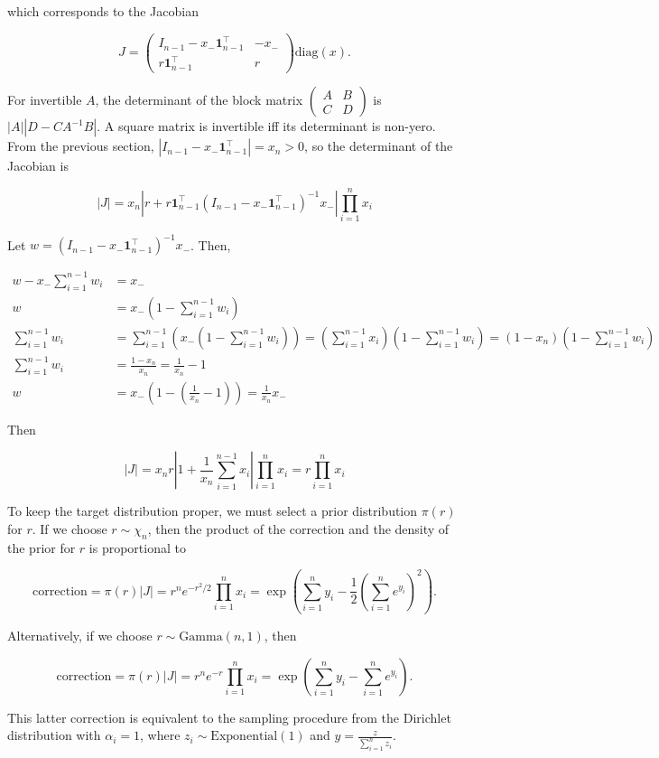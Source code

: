 \documentclass[twoside]{article}
\begin{document}
which corresponds to the Jacobian

$$J = \begin{pmatrix}I_{n-1} - x_- \boldsymbol{1}_{n-1}^\top & -x_- \\ r \boldsymbol{1}_{n-1}^\top & r \end{pmatrix} \mathrm{diag}(x).$$

For invertible $A$, the determinant of the block matrix $\begin{pmatrix}A & B \\ C & D\end{pmatrix}$ is $|A| |D-CA^{-1}B|$.
A square matrix is invertible iff its determinant is non-yero.
From the previous section, $|I_{n-1} - x_- \boldsymbol{1}_{n-1}^\top| = x_n > 0$, so the determinant of the Jacobian is

$$|J| = x_n \left|r + r \boldsymbol{1}_{n-1}^\top (I_{n-1} - x_- \boldsymbol{1}_{n-1}^\top)^{-1} x_-\right| \prod_{i=1}^n x_i$$

Let $w = (I_{n-1} - x_- \boldsymbol{1}_{n-1}^\top)^{-1} x_-$. Then,

$$
\begin{aligned}
    w - x_- \sum_{i=1}^{n-1} w_i &= x_-\\
    w &= x_- \left(1 - \sum_{i=1}^{n-1} w_i\right)\\
    \sum_{i=1}^{n-1} w_i &= \sum_{i=1}^{n-1} \left( x_- (1 - \sum_{i=1}^{n-1} w_i) \right) = \left(\sum_{i=1}^{n-1} x_i \right) \left(1 - \sum_{i=1}^{n-1} w_i\right) = (1 - x_n)  \left(1 - \sum_{i=1}^{n-1} w_i\right)\\
    \sum_{i=1}^{n-1} w_i &= \frac{1 - x_n}{x_n} = \frac{1}{x_n} - 1\\
    w &= x_- \left(1 - \left(\frac{1}{x_n} - 1\right)\right) = \frac{1}{x_n} x_-
\end{aligned}
$$

Then

$$|J| = x_n r \left|1 + \frac{1}{x_n}\sum_{i=1}^{n-1} x_i\right| \prod_{i=1}^n x_i = r \prod_{i=1}^n x_i$$

To keep the target distribution proper, we must select a prior distribution $\pi(r)$ for $r$.
If we choose $r \sim \chi_n$, then the product of the correction and the density of the prior for $r$ is proportional to

$$\mathrm{correction} = \pi(r) |J| = r^n e^{-r^2/2} \prod_{i=1}^n x_i = \exp\left(\sum_{i=1}^n y_i - \frac{1}{2}\left(\sum_{i=1}^n e^{y_i}\right)^2\right).$$

Alternatively, if we choose $r \sim \mathrm{Gamma}(n, 1)$, then

$$\mathrm{correction} = \pi(r) |J| = r^n e^{-r} \prod_{i=1}^n x_i = \exp\left(\sum_{i=1}^n y_i - \sum_{i=1}^n e^{y_i}\right).$$

This latter correction is equivalent to the sampling procedure from the Dirichlet distribution with $\alpha_i=1$, where $z_i \sim \mathrm{Exponential}(1)$ and $y = \frac{z}{\sum_{i=1}^n z_i}$.

\vfill
\end{document}
